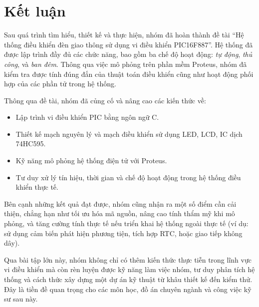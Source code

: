 \section{Kết luận}

Sau quá trình tìm hiểu, thiết kế và thực hiện, nhóm đã hoàn thành đề tài “Hệ thống điều khiển đèn giao thông sử dụng vi điều khiển PIC16F887”. Hệ thống đã được lập trình đầy đủ các chức năng, bao gồm ba chế độ hoạt động: \textit{tự động}, \textit{thủ công}, và \textit{ban đêm}. Thông qua việc mô phỏng trên phần mềm Proteus, nhóm đã kiểm tra được tính đúng đắn của thuật toán điều khiển cũng như hoạt động phối hợp của các phần tử trong hệ thống.

Thông qua đề tài, nhóm đã củng cố và nâng cao các kiến thức về:
\begin{itemize}
    \item Lập trình vi điều khiển PIC bằng ngôn ngữ C.
    \item Thiết kế mạch nguyên lý và mạch điều khiển sử dụng LED, LCD, IC dịch 74HC595.
    \item Kỹ năng mô phỏng hệ thống điện tử với Proteus.
    \item Tư duy xử lý tín hiệu, thời gian và chế độ hoạt động trong hệ thống điều khiển thực tế.
\end{itemize}

Bên cạnh những kết quả đạt được, nhóm cũng nhận ra một số điểm cần cải thiện, chẳng hạn như tối ưu hóa mã nguồn, nâng cao tính thẩm mỹ khi mô phỏng, và tăng cường tính thực tế nếu triển khai hệ thống ngoài thực tế (ví dụ: sử dụng cảm biến phát hiện phương tiện, tích hợp RTC, hoặc giao tiếp không dây).

Qua bài tập lớn này, nhóm không chỉ có thêm kiến thức thực tiễn trong lĩnh vực vi điều khiển mà còn rèn luyện được kỹ năng làm việc nhóm, tư duy phân tích hệ thống và cách thức xây dựng một dự án kỹ thuật từ khâu thiết kế đến kiểm thử. Đây là tiền đề quan trọng cho các môn học, đồ án chuyên ngành và công việc kỹ sư sau này.
\cleardoublepage
